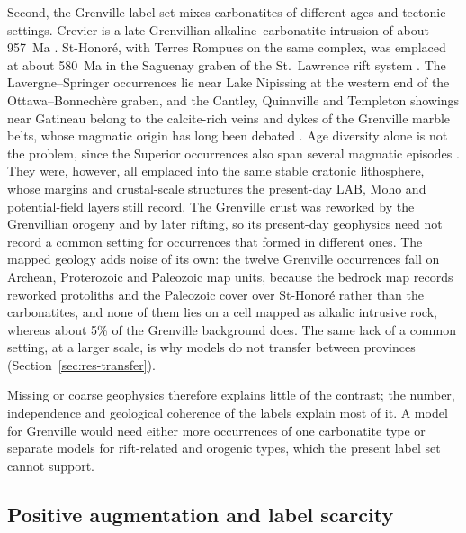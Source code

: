 \documentclass[pdflatex,sn-apa]{sn-jnl}
\begin{document}
Second, the Grenville label set mixes carbonatites of different ages and tectonic settings. Crevier is a late-Grenvillian alkaline--carbonatite intrusion of about 957~Ma \citep{Groulier2020}. St-Honoré, with Terres Rompues on the same complex, was emplaced at about 580~Ma in the Saguenay graben of the St.~Lawrence rift system \citep{Neron2018}. The Lavergne--Springer occurrences lie near Lake Nipissing at the western end of the Ottawa--Bonnech\`ere graben, and the Cantley, Quinnville and Templeton showings near Gatineau belong to the calcite-rich veins and dykes of the Grenville marble belts, whose magmatic origin has long been debated \citep{Moecher1997}. Age diversity alone is not the problem, since the Superior occurrences also span several magmatic episodes \citep{Rukhlov2010}. They were, however, all emplaced into the same stable cratonic lithosphere, whose margins and crustal-scale structures the present-day LAB, Moho and potential-field layers still record. The Grenville crust was reworked by the Grenvillian orogeny and by later rifting, so its present-day geophysics need not record a common setting for occurrences that formed in different ones. The mapped geology adds noise of its own: the twelve Grenville occurrences fall on Archean, Proterozoic and Paleozoic map units, because the bedrock map records reworked protoliths and the Paleozoic cover over St-Honoré rather than the carbonatites, and none of them lies on a cell mapped as alkalic intrusive rock, whereas about 5\% of the Grenville background does. The same lack of a common setting, at a larger scale, is why models do not transfer between provinces (Section~\ref{sec:res-transfer}).

Missing or coarse geophysics therefore explains little of the contrast; the number, independence and geological coherence of the labels explain most of it. A model for Grenville would need either more occurrences of one carbonatite type or separate models for rift-related and orogenic types, which the present label set cannot support.

\subsection{Positive augmentation and label scarcity}\label{sec:disc-gan}
\end{document}
